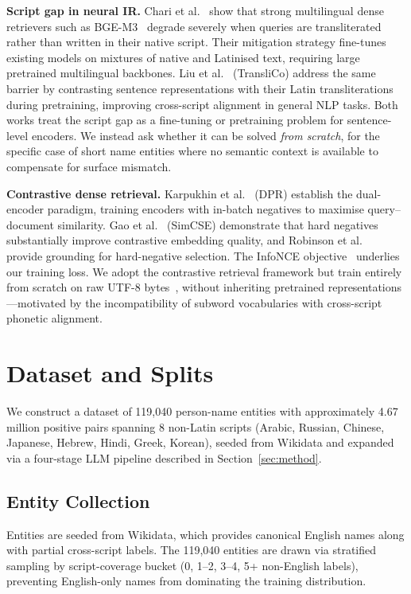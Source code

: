 \documentclass[sigconf]{acmart}
\begin{document}
\noindent\textbf{Script gap in neural IR.}
Chari et al.~\cite{chari2025lost} show that strong multilingual dense retrievers such as
BGE-M3~\cite{chen2024bge} degrade severely when queries are transliterated rather than written in
their native script. Their mitigation strategy fine-tunes existing models on mixtures of native and
Latinised text, requiring large pretrained multilingual backbones. Liu et al.~\cite{liu2024translico}
(TransliCo) address the same barrier by contrasting sentence representations with their Latin
transliterations during pretraining, improving cross-script alignment in general NLP tasks. Both
works treat the script gap as a fine-tuning or pretraining problem for sentence-level encoders.
We instead ask whether it can be solved \emph{from scratch}, for the specific case of short name
entities where no semantic context is available to compensate for surface mismatch.

\noindent\textbf{Contrastive dense retrieval.}
Karpukhin et al.~\cite{karpukhin2020dpr} (DPR) establish the dual-encoder paradigm, training
encoders with in-batch negatives to maximise query--document similarity. Gao et al.~\cite{gao2021simcse}
(SimCSE) demonstrate that hard negatives substantially improve contrastive embedding quality, and
Robinson et al.~\cite{robinson2021hardneg} provide grounding for hard-negative selection. The InfoNCE
objective~\cite{oord2018cpc} underlies our training loss. We adopt the contrastive retrieval framework
but train entirely from scratch on raw UTF-8 bytes~\cite{xue2022byt5}, without inheriting pretrained
representations---motivated by the incompatibility of subword vocabularies with cross-script phonetic
alignment.

\section{Dataset and Splits}
We construct a dataset of 119,040 person-name entities with approximately 4.67 million positive pairs spanning 8 non-Latin scripts (Arabic, Russian, Chinese, Japanese, Hebrew, Hindi, Greek, Korean), seeded from Wikidata and expanded via a four-stage LLM pipeline described in Section~\ref{sec:method}.

\subsection{Entity Collection}
Entities are seeded from Wikidata, which provides canonical English names along with partial cross-script labels. The 119,040 entities are drawn via stratified sampling by script-coverage bucket (0, 1--2, 3--4, 5+ non-English labels), preventing English-only names from dominating the training distribution.
\end{document}
